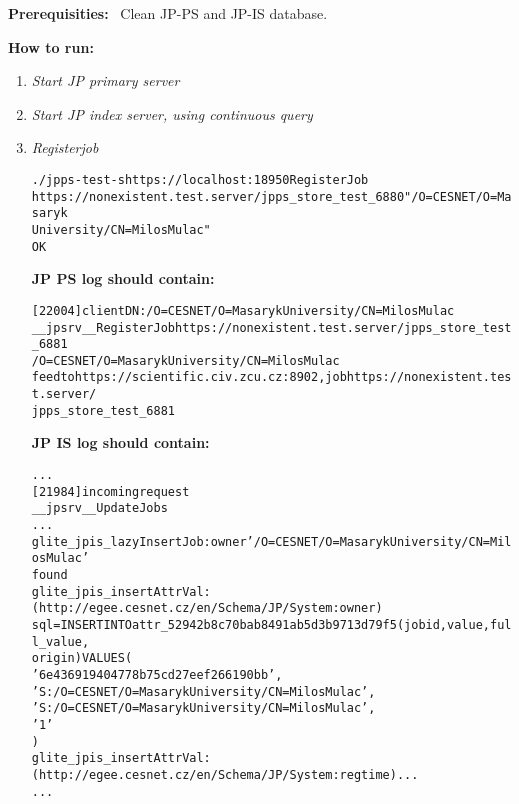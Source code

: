 \documentclass{egee}
\def\req{\noindent\textbf{Prerequisities: }}
\def\how{\noindent\textbf{How to run: }}
\def\jpps{\noindent\textbf{JP PS log should contain: }}
\def\jpis{\noindent\textbf{JP IS log should contain: }}
\begin{document}
\req\ Clean JP-PS and JP-IS database.

\how\
\begin{enumerate}
 \item \emph{Start JP primary server}
 \item \emph{Start JP index server, using continuous query}
 \item \emph{Registerjob}
  \begin{alltt}
	./jpps-test -s https://localhost:18950 RegisterJob 
	https://nonexistent.test.server/jpps_store_test_6880 "/O=CESNET/O=Masaryk 
	University/CN=Milos Mulac"
	OK
  \end{alltt}
  \jpps\
  \begin{alltt}
	[22004] client DN: /O=CESNET/O=Masaryk University/CN=Milos Mulac
	__jpsrv__RegisterJob https://nonexistent.test.server/jpps_store_test_6881 
	/O=CESNET/O=Masaryk University/CN=Milos Mulac
	feed to https://scientific.civ.zcu.cz:8902, job https://nonexistent.test.server/
	jpps_store_test_6881
  \end{alltt}
  \jpis\
  \begin{alltt}
	...
	[21984] incoming request
	__jpsrv__UpdateJobs
	...
	glite_jpis_lazyInsertJob: owner '/O=CESNET/O=Masaryk University/CN=Milos Mulac'
	found
	glite_jpis_insertAttrVal: (http://egee.cesnet.cz/en/Schema/JP/System:owner) 
	sql=INSERT INTO attr_52942b8c70bab8491ab5d3b9713d79f5 (jobid, value, full_value, 
	origin) VALUES (
        '6e436919404778b75cd27eef266190bb',
        'S:/O=CESNET/O=Masaryk University/CN=Milos Mulac',
        'S:/O=CESNET/O=Masaryk University/CN=Milos Mulac',
        '1'
)
	glite_jpis_insertAttrVal: (http://egee.cesnet.cz/en/Schema/JP/System:regtime) ...
	...
  \end{alltt}


\end{enumerate}
\end{document}
